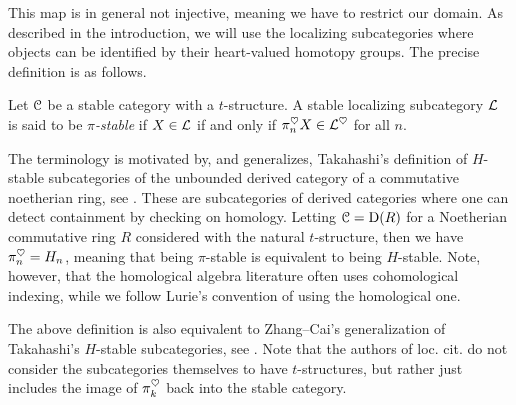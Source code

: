 This map is in general not injective, meaning we have to restrict our domain. As described in the introduction, we will use the localizing subcategories where objects can be identified by their heart-valued homotopy groups. The precise definition is as follows. 

\begin{definition}
    \label{ch3:def:pi-stable-localizing-subcategory}
    Let $\EuScript{C}$ be a stable category with a $t$-structure. A stable localizing subcategory $\mathcal{L}$ is said to be \emph{$\pi$-stable} if $X\in \mathcal{L}$ if and only if $\pi_n^\heartsuit X\in \mathcal{L}^\heartsuit$ for all $n$. 
\end{definition}

\begin{remark}
    The terminology is motivated by, and generalizes, Takahashi's definition of $H$-stable subcategories of the unbounded derived category of a commutative noetherian ring, see \cite[2.11]{takahashi_2009}. These are subcategories of derived categories where one can detect containment by checking on homology. Letting $\EuScript{C}=\mathrm{D}(R)$ for a Noetherian commutative ring $R$ considered with the natural $t$-structure, then we have $\pi_n^\heartsuit = H_n$, meaning that being $\pi$-stable is equivalent to being $H$-stable. Note, however, that the homological algebra literature often uses cohomological indexing, while we follow Lurie's convention of using the homological one. 
\end{remark}

\begin{remark}
    The above definition is also equivalent to Zhang--Cai's generalization of Takahashi's $H$-stable subcategories, see \cite{zhang-cai_2017}. Note that the authors of loc. cit. do not consider the subcategories themselves to have $t$-structures, but rather just includes the image of $\pi_k^\heartsuit$ back into the stable category. 
\end{remark}


